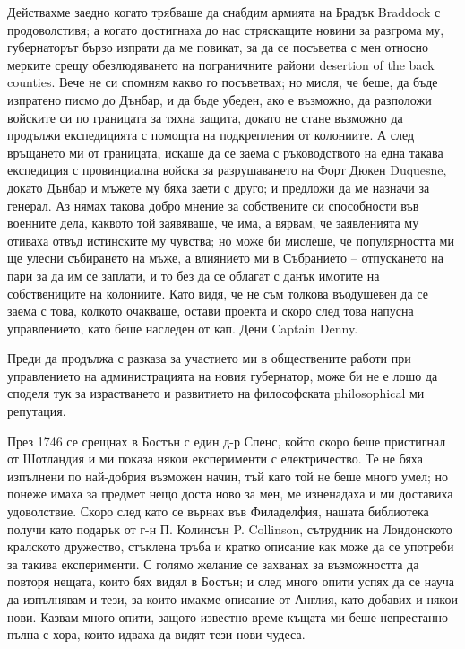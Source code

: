 \documentclass[12pt]{book}
\begin{document}
Действахме заедно когато трябваше да снабдим армията на Брадък Braddock с продоволстивя; а когато достигнаха до нас стряскащите новини за разгрома му, губернаторът бързо изпрати да ме повикат, за да се посъветва с мен относно мерките срещу обезлюдяването на пограничните райони desertion of the back counties. Вече не си спомням какво го посъветвах; но мисля, че беше, да бъде изпратено писмо до Дънбар, и да бъде убеден, ако е възможно, да разположи войските си по границата за тяхна защита, докато не стане възможно да продължи експедицията с помощта на подкрепления от колониите. А след връщането ми от границата, искаше да се заема с ръководството на една такава експедиция с провинциална войска за разрушаването на Форт Дюкен Duquesne, докато Дънбар и мъжете му бяха заети с друго; и предложи да ме назначи за генерал. Аз нямах такова добро мнение за собствените си способности във военните дела, каквото той заявяваше, че има, а вярвам, че заявленията му отиваха отвъд истинските му чувства; но може би мислеше, че популярността ми ще улесни събирането на мъже, а влиянието ми в Събранието – отпускането на пари за да им се заплати, и то без да се облагат с данък имотите на собствениците на колониите. Като видя, че не съм толкова въодушевен да се заема с това, колкото очакваше, остави проекта и скоро след това напусна управлението, като беше наследен от кап. Дени Captain Denny.

Преди да продължа с разказа за участието ми в обществените работи при управлението на администрацията на новия губернатор, може би не е лошо да споделя тук за израстването и развитието на философската philosophical ми репутация.

През 1746 се срещнах в Бостън с един д-р Спенс, който скоро беше пристигнал от Шотландия и ми показа някои експерименти с електричество. Те не бяха изпълнени по най-добрия възможен начин, тъй като той не беше много умел; но понеже имаха за предмет нещо доста ново за мен, ме изненадаха и ми доставиха удоволствие. Скоро след като се върнах във Филаделфия, нашата библиотека получи като подарък от г-н П. Колинсън P. Collinson, сътрудник на Лондонското кралското дружество, стъклена тръба и кратко описание как може да се употреби за такива експерименти. С голямо желание се захванах за възможността да повторя нещата, които бях видял в Бостън; и след много опити успях да се науча да изпълнявам и тези, за които имахме описание от Англия, като добавих и някои нови. Казвам много опити, защото известно време къщата ми беше непрестанно пълна с хора, които идваха да видят тези нови чудеса. 
\end{document}
